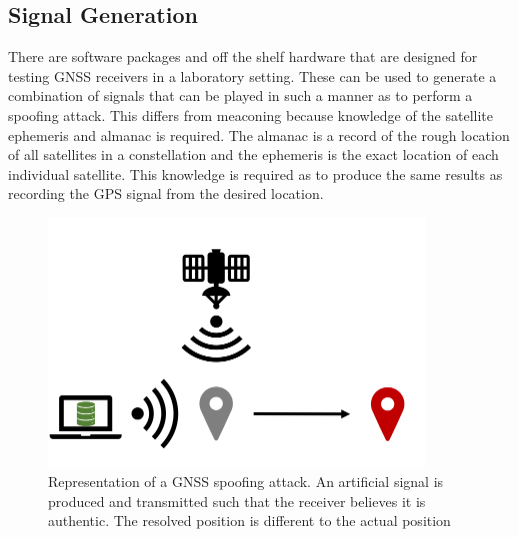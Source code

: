 \subsection{Signal Generation}
There are software packages and off the shelf hardware that are designed for testing GNSS receivers in a laboratory setting. These can be used to generate a combination
of signals that can be
played in such a manner as to perform a spoofing attack. This differs from meaconing because knowledge of the satellite ephemeris and almanac is required. The almanac is
a record of the rough location of all satellites in a constellation and the ephemeris is the exact location of each individual satellite. This knowledge is required as to
produce the same results as recording the GPS signal from the desired location.

\begin{figure}[h]
    \begin{centering}
        \includegraphics[width=10cm, keepaspectratio]{Figures/Spoofing.png}
        \caption{Representation of a GNSS spoofing attack. An artificial signal is produced and transmitted such that the receiver believes it is authentic. The resolved position is different to the actual position}
    \label{fig:spoofing cartoon}
    \end{centering}
\end{figure}


